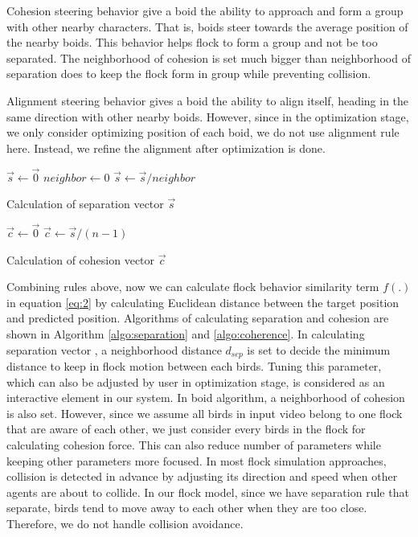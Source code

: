 Cohesion steering behavior give a boid the ability to approach and form a group with other nearby characters. That is, boids steer towards the average position of the nearby boids. This behavior helps flock to form a group and not be too separated. The neighborhood of cohesion is set much bigger than neighborhood of separation does to keep the flock form in group while preventing collision.


Alignment steering behavior gives a boid the ability to align itself, heading in the same direction with other nearby boids. However, since in the optimization stage, we only consider optimizing position of each boid, we do not use alignment rule here. Instead, we refine the alignment after optimization is done.


\begin{algorithm}[p]
\SetAlgoLined
{}
$\vec{s} \leftarrow \vec{0}$ \;
$neighbor \leftarrow 0 $ \;
$\vec{s} \leftarrow \vec{s} / neighbor$ \;
\caption{Calculation of separation vector $\vec{s}$}
\label{algo:separation}
\end{algorithm}


\begin{algorithm}[p]
\SetAlgoLined
{}
$\vec{c} \leftarrow \vec{0}$ \;
$\vec{c} \leftarrow \vec{s} / (n-1)$ \;
\caption{Calculation of cohesion vector $\vec{c}$}
\label{algo:coherence}
\end{algorithm}


Combining rules above, now we can calculate flock behavior similarity term $f(.)$ in equation \ref{eq:2} by calculating Euclidean distance between the target position and predicted position. Algorithms of calculating separation and cohesion are shown in Algorithm \ref{algo:separation} and \ref{algo:coherence}. In calculating separation vector , a neighborhood distance $d_{sep}$ is set to decide the minimum distance to keep in flock motion between each birds. Tuning this parameter, which can also be adjusted by user in optimization stage, is considered as an interactive element in our system. In boid algorithm, a neighborhood of cohesion is also set. However, since we assume all birds in input video belong to one flock that are aware of each other, we just consider every birds in the flock for calculating cohesion force. This can also reduce number of parameters while keeping other parameters more focused.
In most flock simulation approaches, collision is detected in advance by adjusting its direction and speed when other agents are about to collide. In our flock model, since we have separation rule that separate, birds tend to move away to each other when they are too close. Therefore, we do not handle collision avoidance.


